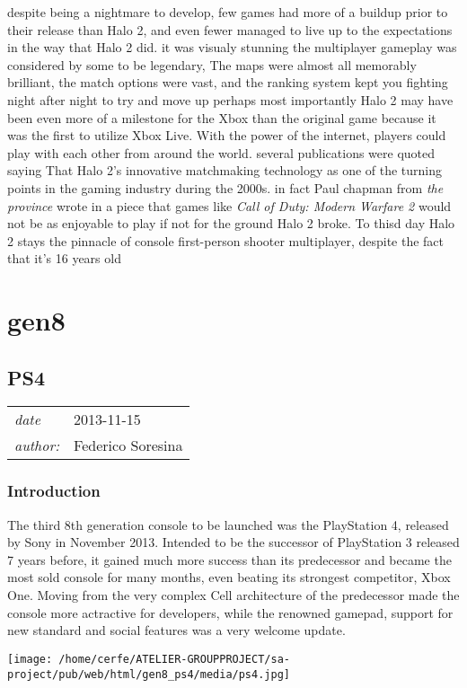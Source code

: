 \documentclass[a4paper,10pt]{book}
\newcommand{\pageHeader}[4]{
    \section{#1}
    \vspace{-0.3cm}
    \begin{table}[h!]
     \begin{tabular}{ll}
        \hline
        \textit{date} & #2 \\
        \textit{author: } & #3\\
        \hline
     \end{tabular}
    \end{table}
    \vspace{-0.3cm}
}
\begin{document}
          despite being a nightmare to develop, few games had more of a buildup prior to their release than Halo 2, and even fewer managed to live up to the expectations in the way that Halo 2 did.
          it was visualy stunning the multiplayer gameplay was considered by some to be legendary, The maps were almost all memorably brilliant, the match options were vast, and the ranking system kept
          you fighting night after night to try and move up perhaps most importantly Halo 2 may have been even more of a milestone for the Xbox than the original game because it was the
          first to utilize Xbox Live. With the power of the internet, players could play with each other from around the world. several publications were quoted saying That
          Halo 2's innovative matchmaking technology as one of the turning points in the gaming industry during the 2000s. in fact Paul chapman from  \textit{the province } 
          wrote in a piece that games like  \textit{ Call of Duty: Modern Warfare 2 } would not be as enjoyable to play if not for the ground Halo 2 broke. To thisd day Halo 2 stays the pinnacle 
          of console first-person shooter multiplayer, despite the fact that it's 16 years old

         
 \newpage\chapter{gen8}\newpage\pageHeader{PS4}{2013-11-15}{Federico Soresina}{PlayStation 4 description page}
 \subsection{ Introduction  }
  The third 8th generation console to be launched was the PlayStation 4, released by Sony in November 2013. Intended to be the successor of PlayStation 3 released 7 years before, it gained much more success than its predecessor and became the most sold console for many months, even beating its strongest competitor, Xbox One. Moving from the very complex Cell architecture of the predecessor made the console more actractive for developers, while the renowned gamepad, support for new standard and social features was a very welcome update.  
 
 
 \texttt{[image: /home/cerfe/ATELIER-GROUPPROJECT/sa-project/pub/web/html/gen8\_ps4/media/ps4.jpg]}
 
 
\end{document}
